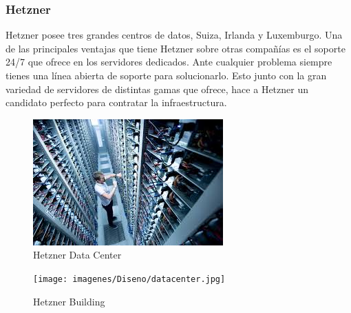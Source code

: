                 \subsubsection{Hetzner}
                \begin{text}
                        Hetzner posee tres grandes centros de datos, Suiza, Irlanda y Luxemburgo. Una de las principales ventajas que tiene Hetzner sobre otras compañías es el soporte 24/7 que ofrece en los servidores dedicados. Ante cualquier problema siempre tienes una línea abierta de soporte para solucionarlo. Esto junto con la gran variedad de servidores de distintas gamas que ofrece, hace a Hetzner un candidato perfecto para contratar la infraestructura.

                        \begin{figure}[!hbt]
                                \centering
                                \includegraphics[scale=0.75]{imagenes/Diseno/baremetal.jpeg}
                                \caption[Hetzner Data Center]{Hetzner Data Center \cite{hetzner:online}} 
                                \label{Hetzner Data Center}
                        \end{figure} 

                        \begin{figure}[!hbt]
                                \centering
                                \texttt{[image: imagenes/Diseno/datacenter.jpg]}
                                \caption[Hetzner Building]{Hetzner Building \cite{hetzner:online}} 
                                \label{Hetzner Building}
                                \end{figure} 
                        \end{text}

